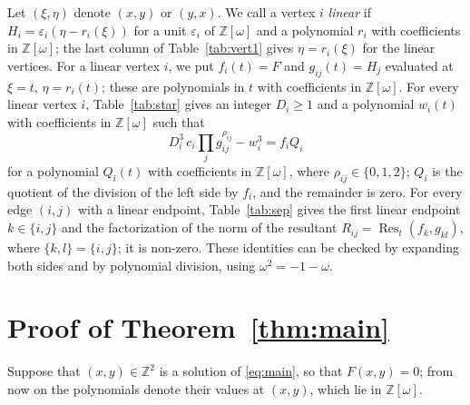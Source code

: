 \documentclass[11pt]{article}
\newcommand{\Z}{\mathbb{Z}}
\begin{document}
Let $(\xi,\eta)$ denote $(x,y)$ or $(y,x)$. We call a vertex $i$ \emph{linear} if $H_i=\varepsilon_i(\eta-r_i(\xi))$ for a unit $\varepsilon_i$ of $\Z[\omega]$ and a polynomial $r_i$ with coefficients in $\Z[\omega]$; the last column of Table~\ref{tab:vert1} gives $\eta=r_i(\xi)$ for the linear vertices. For a linear vertex $i$, we put $f_i(t)=F$ and $g_{ij}(t)=H_j$ evaluated at $\xi=t$, $\eta=r_i(t)$; these are polynomials in $t$ with coefficients in $\Z[\omega]$.
For every linear vertex $i$, Table~\ref{tab:star} gives an integer $D_i\geq1$ and a polynomial $w_i(t)$ with coefficients in $\Z[\omega]$ such that
\begin{equation}\label{eq:starlin}
D_i^3\,c_i\prod_jg_{ij}^{\rho_{ij}}-w_i^3=f_iQ_i
\end{equation}
for a polynomial $Q_i(t)$ with coefficients in $\Z[\omega]$, where $\rho_{ij}\in\{0,1,2\}$; $Q_i$ is the quotient of the division of the left side by $f_i$, and the remainder is zero.
For every edge $(i,j)$ with a linear endpoint, Table~\ref{tab:sep} gives the first linear endpoint $k\in\{i,j\}$ and the factorization of the norm of the resultant $R_{ij}=\operatorname{Res}_t(f_k,g_{kl})$, where $\{k,l\}=\{i,j\}$; it is non-zero.
These identities can be checked by expanding both sides and by polynomial division, using $\omega^2=-1-\omega$.

\section{Proof of Theorem~\ref{thm:main}}

Suppose that $(x,y)\in\Z^2$ is a solution of \eqref{eq:main}, so that $F(x,y)=0$; from now on the polynomials denote their values at $(x,y)$, which lie in $\Z[\omega]$.
\end{document}
